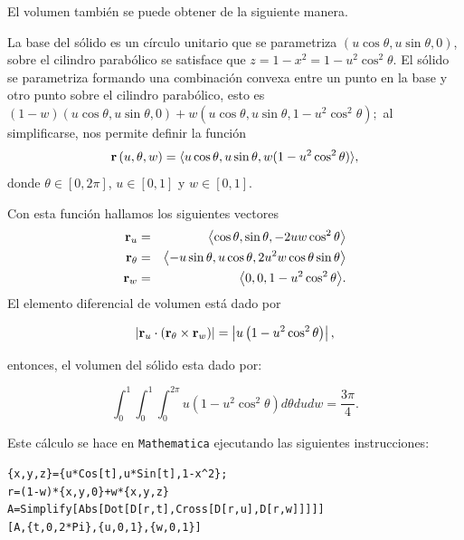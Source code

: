 El volumen también se puede obtener de la siguiente manera.

La base del sólido es un círculo unitario que se parametriza {\small $\left(u\cos \theta ,u\sin \theta ,0\right)$,} sobre el cilindro parabólico se satisface que $z=1-x^2=1-u^2\cos ^2\theta $. El sólido se parametriza formando una combinación convexa entre un punto en la base y otro punto sobre el cilindro parabólico, esto es
$ (1-w)(u\cos \theta ,u\sin \theta ,0) +w( u\cos \theta ,u\sin \theta ,1-u^2\cos ^2\theta);$
al simplificarse, nos permite definir la función
%
{\small
\[{\bf r}\left( u,\theta ,w\right) =\langle u\cos \theta , u\sin \theta ,w(1-u^2\cos ^2\theta )\rangle,\]
}
%
donde $\theta \in [0,2\pi]$, $u \in [0,1]$ y $w \in [0,1]$.

Con esta función hallamos los siguientes vectores
\begin{eqnarray*}
{\bf r}_{u} &=& \left\langle \cos \theta,\sin \theta, -2uw\cos ^2\theta \right\rangle \\
{\bf r}_{\theta } &=& \left\langle -u\sin \theta , u\cos \theta , 2u^2w\cos \theta \sin \theta \right\rangle \\
{\bf r}_{w} &=& \left\langle 0 , 0 , 1-u^2\cos ^2\theta \right\rangle\!.
\end{eqnarray*}
El elemento diferencial de volumen está dado por

\[\left\vert {\bf r}_{u}\cdot \left( {\bf r}_{\theta }\times {\bf r}_{w}\right) \right\vert =\left\vert u\left( 1-u^2\cos ^2\theta \right) \right\vert,\]

entonces, el volumen del sólido esta dado por:

{\small
\[\int_{0}^{1}\int_{0}^{1}\int_{0}^{2\pi }u\left( 1-u^2\cos ^2\theta
\right) d\theta dudw= \frac{3\pi}{4}.\]
}

Este cálculo se hace en \verb"Mathematica" ejecutando las siguientes instrucciones:

\begin{tcolorbox}[title=\bf Instrucción en \verb"Mathematica"]\begin{Verbatim}[formatcom=\letraverbatim]
{x,y,z}={u*Cos[t],u*Sin[t],1-x^2};
r=(1-w)*{x,y,0}+w*{x,y,z}
A=Simplify[Abs[Dot[D[r,t],Cross[D[r,u],D[r,w]]]]]
[A,{t,0,2*Pi},{u,0,1},{w,0,1}]
\end{Verbatim}
\end{tcolorbox}

